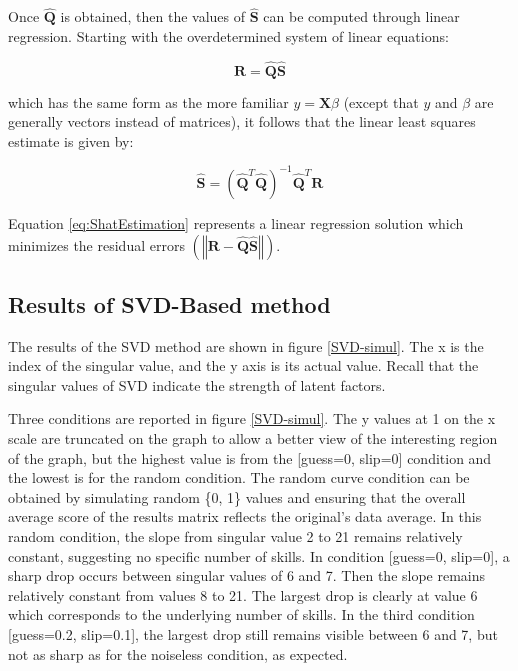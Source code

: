 Once $\hat{\mathbf{Q}}$ is obtained, then the values of $\hat{\mathbf{S}}$ can be computed through linear regression. Starting with the overdetermined system of linear equations:

\begin{equation}
\mathbf{R}=\hat{\mathbf{Q}}\hat{\mathbf{S}}\label{eq:Estimation}
\end{equation}


which has the same form as the more familiar $y=\mathbf{X}\beta$ (except that $y$ and $\beta$ are generally vectors instead of matrices), it follows that the linear least squares estimate is given by:

\begin{equation}
\hat{\mathbf{S}}=\left(\hat{\mathbf{Q}}^{T}\hat{\mathbf{Q}}\right)^{-1}\hat{\mathbf{Q}}^{T}\mathbf{R}\label{eq:ShatEstimation}
\end{equation}


Equation \ref{eq:ShatEstimation} represents a linear regression solution which minimizes the residual errors $\left(\left\Vert \mathbf{R}-\hat{\mathbf{Q}}\hat{\mathbf{S}}\right\Vert \right)$.

\subsection{Results of SVD-Based method}


The results of the SVD method are shown in figure \ref{SVD-simul}. The x is the index of the singular value, and the y axis is its actual value. Recall that the singular values of SVD indicate the strength of latent factors.

Three conditions are reported in figure \ref{SVD-simul}. The y values at 1 on the x scale are truncated on the graph to allow a better view of the interesting region of the graph, but the highest value is from the {[}guess=0, slip=0{]} condition and the lowest is for the random condition. The random curve condition can be obtained by simulating random \{0, 1\} values and ensuring that the overall average score of the results matrix reflects the original's data average. In this random condition, the slope from singular value 2 to 21 remains relatively constant, suggesting no specific number of skills. In condition {[}guess=0, slip=0{]}, a sharp drop occurs between singular values of 6 and 7. Then the slope remains relatively constant from values 8 to 21. The largest drop is clearly at value 6 which corresponds to the underlying number of skills. In the third condition {[}guess=0.2, slip=0.1{]}, the largest drop still remains visible between 6 and 7, but not as sharp as for the noiseless condition,
as expected.

